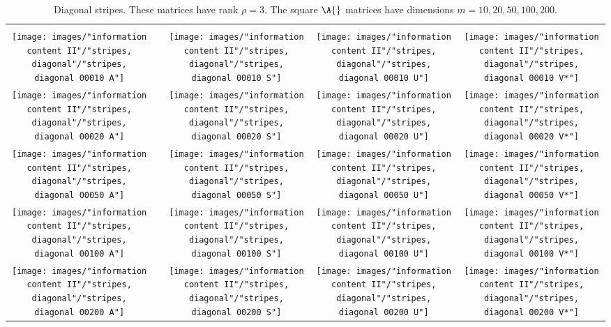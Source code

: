 \begin{table}[htdp]
\caption[Diagonal stripes]{Diagonal stripes. These matrices have rank $\rho = 3$. The square $\A{}$ matrices have dimensions $m=10,20,50,100,200$.}
\begin{center}
\begin{tabular}{ccccc}
%
 \svdi{} \\
%
 \texttt{[image: images/"information content II"/"stripes, diagonal"/"stripes, diagonal 00010 A"]} &&
 \texttt{[image: images/"information content II"/"stripes, diagonal"/"stripes, diagonal 00010 S"]} &
 \texttt{[image: images/"information content II"/"stripes, diagonal"/"stripes, diagonal 00010 U"]} &
 \texttt{[image: images/"information content II"/"stripes, diagonal"/"stripes, diagonal 00010 V*"]} \\
%
 \texttt{[image: images/"information content II"/"stripes, diagonal"/"stripes, diagonal 00020 A"]} &&
 \texttt{[image: images/"information content II"/"stripes, diagonal"/"stripes, diagonal 00020 S"]} &
 \texttt{[image: images/"information content II"/"stripes, diagonal"/"stripes, diagonal 00020 U"]} &
 \texttt{[image: images/"information content II"/"stripes, diagonal"/"stripes, diagonal 00020 V*"]} \\
%
 \texttt{[image: images/"information content II"/"stripes, diagonal"/"stripes, diagonal 00050 A"]} &&
 \texttt{[image: images/"information content II"/"stripes, diagonal"/"stripes, diagonal 00050 S"]} &
 \texttt{[image: images/"information content II"/"stripes, diagonal"/"stripes, diagonal 00050 U"]} &
 \texttt{[image: images/"information content II"/"stripes, diagonal"/"stripes, diagonal 00050 V*"]} \\
%
 \texttt{[image: images/"information content II"/"stripes, diagonal"/"stripes, diagonal 00100 A"]} &&
 \texttt{[image: images/"information content II"/"stripes, diagonal"/"stripes, diagonal 00100 S"]} &
 \texttt{[image: images/"information content II"/"stripes, diagonal"/"stripes, diagonal 00100 U"]} &
 \texttt{[image: images/"information content II"/"stripes, diagonal"/"stripes, diagonal 00100 V*"]} \\
%
 \texttt{[image: images/"information content II"/"stripes, diagonal"/"stripes, diagonal 00200 A"]} &&
 \texttt{[image: images/"information content II"/"stripes, diagonal"/"stripes, diagonal 00200 S"]} &
 \texttt{[image: images/"information content II"/"stripes, diagonal"/"stripes, diagonal 00200 U"]} &
 \texttt{[image: images/"information content II"/"stripes, diagonal"/"stripes, diagonal 00200 V*"]} 
\end{tabular}
\end{center}
\label{tab:info content II:diagonal stripes}
\end{table}%


\endinput
